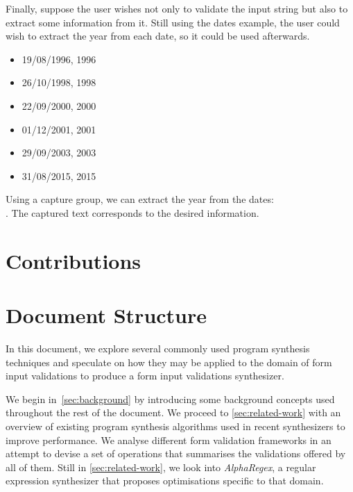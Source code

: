 Finally, suppose the user wishes not only to validate the input string but also to extract some information from it. Still using the dates example, the user could wish to extract the year from each date, so it could be used afterwards.
\begin{multicols}{3}
    \begin{itemize}[label={},noitemsep]
    \item 19/08/1996, 1996
    \item 26/10/1998, 1998
    \item 22/09/2000, 2000
    \item 01/12/2001, 2001
    \item 29/09/2003, 2003
    \item 31/08/2015, 2015
    \end{itemize}
\end{multicols}

Using a capture group, we can extract the year from the dates:\\ . The captured text corresponds to the desired information.

\section{Contributions}

\section{Document Structure}

In this document, we explore several commonly used program synthesis techniques and speculate on how they may be applied to the domain of form input validations to produce a form input validations synthesizer.

We begin in~\autoref{sec:background} by introducing some background concepts used throughout the rest of the document.
We proceed to \autoref{sec:related-work} with an overview of existing program synthesis algorithms used in recent synthesizers to improve performance.
We analyse different form validation frameworks in an attempt to devise a set of operations that summarises the validations offered by all of them. Still in \autoref{sec:related-work}, we look into \textit{AlphaRegex}, a regular expression synthesizer that proposes optimisations specific to that domain.


